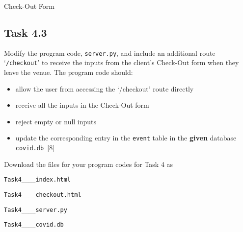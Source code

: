 \noindent \begin{center}
Check-Out Form
\par\end{center}

\subsection*{Task 4.3}

Modify the program code, \texttt{server.py}, and include an additional
route \textquoteleft \texttt{/checkout}\textquoteright{} to receive
the inputs from the client\textquoteright s Check-Out form when they
leave the venue. The program code should: 
\begin{itemize}
\item allow the user from accessing the \textquoteleft /checkout\textquoteright{}
route directly 
\item receive all the inputs in the Check-Out form 
\item reject empty or null inputs 
\item update the corresponding entry in the \texttt{event} table in the
\textbf{given} database \texttt{covid.db }\hfill{}{[}8{]}
\end{itemize}
Download the files for your program codes for Task 4 as 

\texttt{Task4\_<your name>\_<centre number>\_<index number>\_index.html }

\texttt{Task4\_<your name>\_<centre number>\_<index number>\_checkout.html}

\texttt{Task4\_<your name>\_<centre number>\_<index number>\_server.py }

\texttt{Task4\_<your name>\_<centre number>\_<index number>\_covid.db}